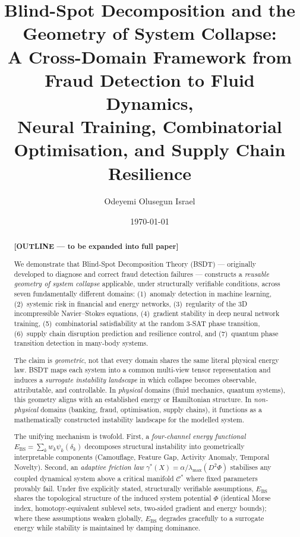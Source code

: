 \documentclass[11pt,a4paper]{article}
\title{\textbf{Blind-Spot Decomposition and the Geometry of System Collapse:\\
  A Cross-Domain Framework from Fraud Detection to Fluid Dynamics,\\
  Neural Training, Combinatorial Optimisation, and Supply Chain Resilience}}
\author[1]{Odeyemi Olusegun Israel}
\affil[1]{Independent Researcher, Derby, United Kingdom\\
  \texttt{segettii@gmail.com} \quad ORCID: 0009-0004-2309-6436}
\date{\today}
\newcommand{\Ebs}{E_{\mathrm{BS}}}
\newcommand{\Cman}{\mathcal{C}^*}
\begin{document}
\maketitle

\begin{abstract}

\textbf{[OUTLINE — to be expanded into full paper]}

We demonstrate that Blind-Spot Decomposition Theory (BSDT) --- originally
developed to diagnose and correct fraud detection failures --- constructs
a \emph{reusable geometry of system collapse} applicable, under structurally
verifiable conditions, across seven fundamentally
different domains: (1)~anomaly detection in machine learning,
(2)~systemic risk in financial and energy networks, (3)~regularity of
the 3D incompressible Navier--Stokes equations, (4)~gradient stability
in deep neural network training, (5)~combinatorial satisfiability at
the random 3-SAT phase transition, (6)~supply chain disruption
prediction and resilience control, and (7)~quantum phase transition
detection in many-body systems.

The claim is \emph{geometric}, not that every domain shares the same
literal physical energy law.  BSDT maps each system into a common
multi-view tensor representation and induces a \emph{surrogate
instability landscape} in which collapse becomes observable,
attributable, and controllable.  In \emph{physical} domains (fluid
mechanics, quantum systems), this geometry aligns with an established
energy or Hamiltonian structure.  In \emph{non-physical} domains
(banking, fraud, optimisation, supply chains), it functions as a
mathematically constructed instability landscape for the modelled
system.

The unifying mechanism is twofold.  First, a \emph{four-channel energy
functional} $\Ebs = \sum_k w_k \psi_k(\delta_k)$ decomposes structural
instability into geometrically interpretable components (Camouflage,
Feature Gap, Activity Anomaly, Temporal Novelty).  Second, an
\emph{adaptive friction law} $\gamma^*(X) = \alpha / \lambda_{\max}
(D^2\Phi)$ stabilises any coupled dynamical system above a critical
manifold $\Cman$ where fixed parameters provably fail.  Under five
explicitly stated, structurally verifiable assumptions, $\Ebs$ shares
the topological structure of the induced system potential $\Phi$
(identical Morse index, homotopy-equivalent sublevel sets, two-sided
gradient and energy bounds); where these assumptions weaken globally,
$\Ebs$ degrades gracefully to a surrogate energy while stability is
maintained by damping dominance.


\end{abstract}
\end{document}
